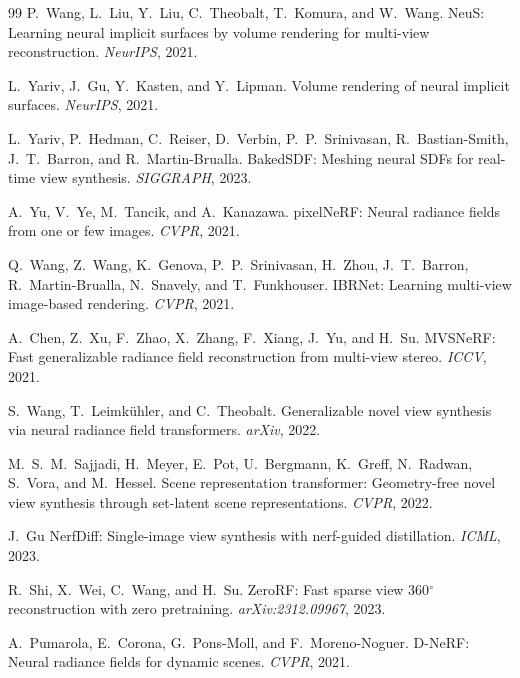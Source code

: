 \begin{thebibliography}{99}
P.~Wang, L.~Liu, Y.~Liu, C.~Theobalt, T.~Komura, and W.~Wang.
NeuS: Learning neural implicit surfaces by volume rendering for multi-view
reconstruction.
\emph{NeurIPS}, 2021.


L.~Yariv, J.~Gu, Y.~Kasten, and Y.~Lipman.
Volume rendering of neural implicit surfaces.
\emph{NeurIPS}, 2021.


L.~Yariv, P.~Hedman, C.~Reiser, D.~Verbin, P.~P.~Srinivasan, R.~Bastian-Smith,
J.~T.~Barron, and R.~Martin-Brualla.
BakedSDF: Meshing neural SDFs for real-time view synthesis.
\emph{SIGGRAPH}, 2023.


A.~Yu, V.~Ye, M.~Tancik, and A.~Kanazawa.
pixelNeRF: Neural radiance fields from one or few images.
\emph{CVPR}, 2021.


Q.~Wang, Z.~Wang, K.~Genova, P.~P.~Srinivasan, H.~Zhou, J.~T.~Barron,
R.~Martin-Brualla, N.~Snavely, and T.~Funkhouser.
IBRNet: Learning multi-view image-based rendering.
\emph{CVPR}, 2021.


A.~Chen, Z.~Xu, F.~Zhao, X.~Zhang, F.~Xiang, J.~Yu, and H.~Su.
MVSNeRF: Fast generalizable radiance field reconstruction from multi-view
stereo.
\emph{ICCV}, 2021.


S.~Wang, T.~Leimk\"{u}hler, and C.~Theobalt.
Generalizable novel view synthesis via neural radiance field transformers.
\emph{arXiv}, 2022.


M.~S.~M.~Sajjadi, H.~Meyer, E.~Pot, U.~Bergmann, K.~Greff, N.~Radwan,
S.~Vora, and M.~Hessel.
Scene representation transformer: Geometry-free novel view synthesis through
set-latent scene representations.
\emph{CVPR}, 2022.


J.~Gu \etal
NerfDiff: Single-image view synthesis with nerf-guided distillation.
\emph{ICML}, 2023.


R.~Shi, X.~Wei, C.~Wang, and H.~Su.
ZeroRF: Fast sparse view 360$^\circ$ reconstruction with zero pretraining.
\emph{arXiv:2312.09967}, 2023.


A.~Pumarola, E.~Corona, G.~Pons-Moll, and F.~Moreno-Noguer.
D-NeRF: Neural radiance fields for dynamic scenes.
\emph{CVPR}, 2021.



\end{thebibliography}

